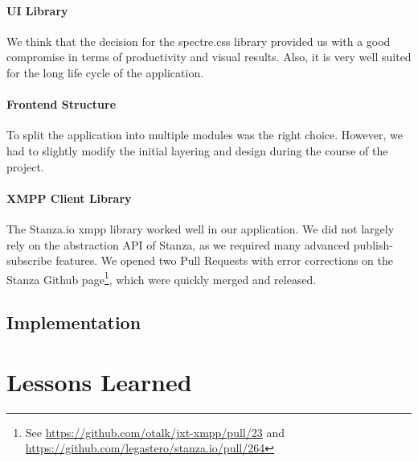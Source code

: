 \paragraph{UI Library}
We think that the decision for the spectre.css library provided us with a good compromise in terms of productivity and visual results. Also, it is very well suited for the long life cycle of the application.

\paragraph{Frontend Structure}
To split the application into multiple modules was the right choice.
However, we had to slightly modify the initial layering and design during the course of the project.

\paragraph{XMPP Client Library}
The Stanza.io \gls{xmpp} library worked well in our application.
We did not largely rely on the abstraction API of Stanza, as we required many advanced \gls{publish-subscribe} features.
We opened two Pull Requests with error corrections on the Stanza Github page\footnote{See \url{https://github.com/otalk/jxt-xmpp/pull/23} and \url{https://github.com/legastero/stanza.io/pull/264}},
which were quickly merged and released.

\subsection{Implementation}


\section{Lessons Learned}

